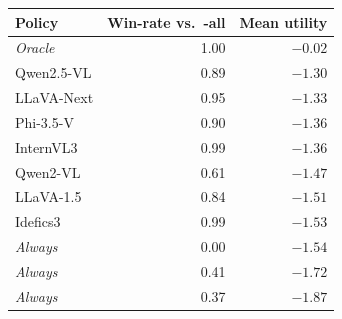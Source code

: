 \setlength{\tabcolsep}{4pt}
\begin{tabular}{lrr}
\toprule
Policy & Win-rate vs.\ \ans{}-all & Mean utility \\
\midrule
\textit{Oracle} & 1.00 & $-0.02$ \\
\midrule
Qwen2.5-VL & 0.89 & $-1.30$ \\
LLaVA-Next & 0.95 & $-1.33$ \\
Phi-3.5-V & 0.90 & $-1.36$ \\
InternVL3 & 0.99 & $-1.36$ \\
Qwen2-VL & 0.61 & $-1.47$ \\
LLaVA-1.5 & 0.84 & $-1.51$ \\
Idefics3 & 0.99 & $-1.53$ \\
\textit{Always \ans{}} & 0.00 & $-1.54$ \\
\textit{Always \ask{}} & 0.41 & $-1.72$ \\
\textit{Always \abs{}} & 0.37 & $-1.87$ \\
\bottomrule
\end{tabular}
